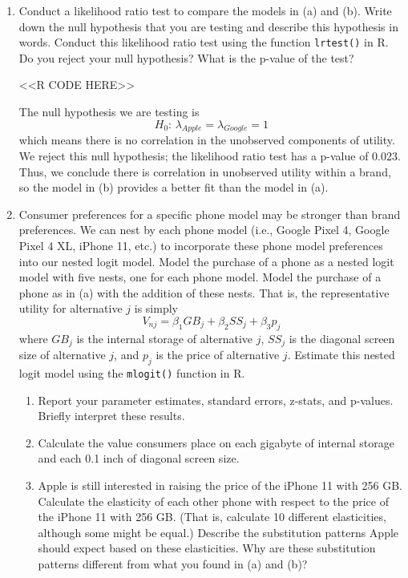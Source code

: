 \documentclass[11pt,letterpaper]{article}
\begin{document}
\begin{enumerate}[label=\alph*., leftmargin=*]
	\item Conduct a likelihood ratio test to compare the models in (a) and (b). Write down the null hypothesis that you are testing and describe this hypothesis in words. Conduct this likelihood ratio test using the function \texttt{lrtest()} in R. Do you reject your null hypothesis? What is the p-value of the test?

	<<R CODE HERE>>

	The null hypothesis we are testing is
	$$H_0 \text{: } \lambda_{Apple} = \lambda_{Google} = 1$$
	which means there is no correlation in the unobserved components of utility. We reject this null hypothesis; the likelihood ratio test has a p-value of 0.023. Thus, we conclude there is correlation in unobserved utility within a brand, so the model in (b) provides a better fit than the model in (a).

	\item Consumer preferences for a specific phone model may be stronger than brand preferences. We can nest by each phone model (i.e., Google Pixel 4, Google Pixel 4 XL, iPhone 11, etc.) to incorporate these phone model preferences into our nested logit model. Model the purchase of a phone as a nested logit model with five nests, one for each phone model. Model the purchase of a phone as in (a) with the addition of these nests. That is, the representative utility for alternative $j$ is simply
	$$V_{nj} = \beta_1 GB_j + \beta_2 SS_j + \beta_3 p_j$$
	where $GB_j$ is the internal storage of alternative $j$, $SS_j$ is the diagonal screen size of alternative $j$, and $p_j$ is the price of alternative $j$. Estimate this nested logit model using the \texttt{mlogit()} function in R. 
	\begin{enumerate}[label=\roman*.]
		\item Report your parameter estimates, standard errors, z-stats, and p-values. Briefly interpret these results. 
		\item Calculate the value consumers place on each gigabyte of internal storage and each 0.1 inch of diagonal screen size.
		\item Apple is still interested in raising the price of the iPhone 11 with 256 GB. Calculate the elasticity of each other phone with respect to the price of the iPhone 11 with 256 GB. (That is, calculate 10 different elasticities, although some might be equal.) Describe the substitution patterns Apple should expect based on these elasticities. Why are these substitution patterns different from what you found in (a) and (b)?
	\end{enumerate}


\end{enumerate}
\end{document}

